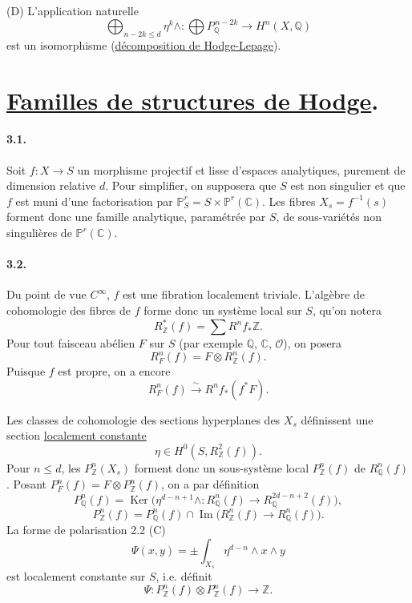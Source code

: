 \documentclass[10pt,leqno]{article}
\newcommand{\C}{\mathbb C}
\newcommand{\Z}{\mathbb Z}
\newcommand{\Q}{\mathbb Q}
\newcommand{\Pj}{\mathbb P}
\newcommand{\cO}{\mathcal O}
\newcommand{\Ker}{\operatorname{Ker}}
\newcommand{\Imop}{\operatorname{Im}}
\theoremstyle{deligne}
\renewcommand{\underline}[1]{\uline{#1}}
\begin{document}
(D) L'application naturelle
\[
\bigoplus_{n-2k\le d}\eta^k\wedge:
\bigoplus P_\Q^{\,n-2k}\longrightarrow H^n(X,\Q)
\]
est un isomorphisme (\underline{décomposition de Hodge-Lepage}).

\section{\underline{Familles de structures de Hodge}.}

\paragraph{3.1.}
Soit $f:X\to S$ un morphisme projectif et lisse d'espaces analytiques, purement de dimension relative $d$. Pour simplifier, on supposera que $S$ est non singulier et que $f$ est muni d'une factorisation par $\Pj^r_S=S\times\Pj^r(\C)$. Les fibres $X_s=f^{-1}(s)$ forment donc une famille analytique, paramétrée par $S$, de sous-variétés non singulières de $\Pj^r(\C)$.

\paragraph{3.2.}
Du point de vue $C^\infty$, $f$ est une fibration localement triviale. L'algèbre de cohomologie des fibres de $f$ forme donc un système local sur $S$, qu'on notera
\[
R_\Z^*(f)=\sum R^n f_*\Z .
\]
Pour tout faisceau abélien $F$ sur $S$ (par exemple $\Q$, $\C$, $\cO$), on posera
\begin{equation}
R_F^n(f)=F\otimes R_\Z^n(f).
\tag{3.2.1}
\end{equation}
Puisque $f$ est propre, on a encore
\[
R_F^n(f)\xrightarrow{\sim} R^n f_*(f^*F).
\]

Les classes de cohomologie des sections hyperplanes des $X_s$ définissent une section \underline{localement constante}
\begin{equation}
\eta\in H^0(S,R_\Z^2(f)).
\tag{3.2.2}
\end{equation}
Pour $n\le d$, les $P_\Z^n(X_s)$ forment donc un sous-système local $P_\Z^n(f)$ de $R_\Q^n(f)$. Posant $P_F^n(f)=F\otimes P_\Z^n(f)$, on a par définition
\begin{equation}
P_\Q^n(f)=\Ker\bigl(\eta^{d-n+1}\wedge:R_\Q^n(f)\to R_\Q^{2d-n+2}(f)\bigr),
\tag{3.2.3}
\end{equation}
\begin{equation}
P_\Z^n(f)=P_\Q^n(f)\cap \Imop\bigl(R_\Z^n(f)\to R_\Q^n(f)\bigr).
\tag{3.2.4}
\end{equation}
La forme de polarisation 2.2 (C)
\begin{equation}
\Psi(x,y)=\pm\int_{X_s}\eta^{d-n}\wedge x\wedge y
\tag{3.2.5}
\end{equation}
est localement constante sur $S$, i.e. définit
\begin{equation}
\Psi:P_\Z^n(f)\otimes P_\Z^n(f)\longrightarrow \Z .
\tag{3.2.6}
\end{equation}
\end{document}
